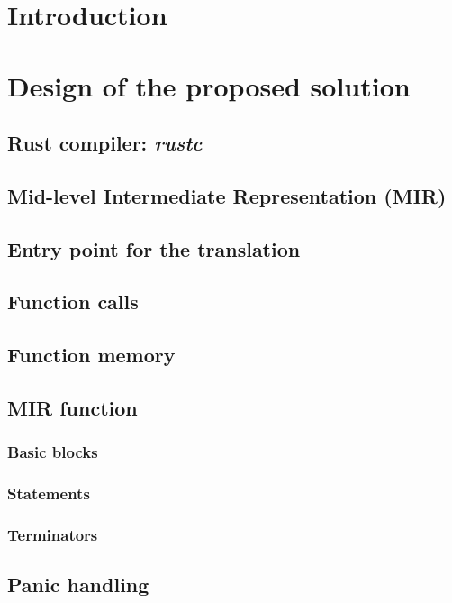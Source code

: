 \documentclass[12pt, oneside]{book}
\begin{document}




\chapter{Introduction}





\bigskip

\chapter{Design of the proposed solution}

\section{Rust compiler: \emph{rustc}}
\section{Mid-level Intermediate Representation (MIR)}
\section{Entry point for the translation}
\section{Function calls}
\section{Function memory}
\section{MIR function}
\subsection{Basic blocks}
\subsection{Statements}
\subsection{Terminators}
\section{Panic handling}
\end{document}
